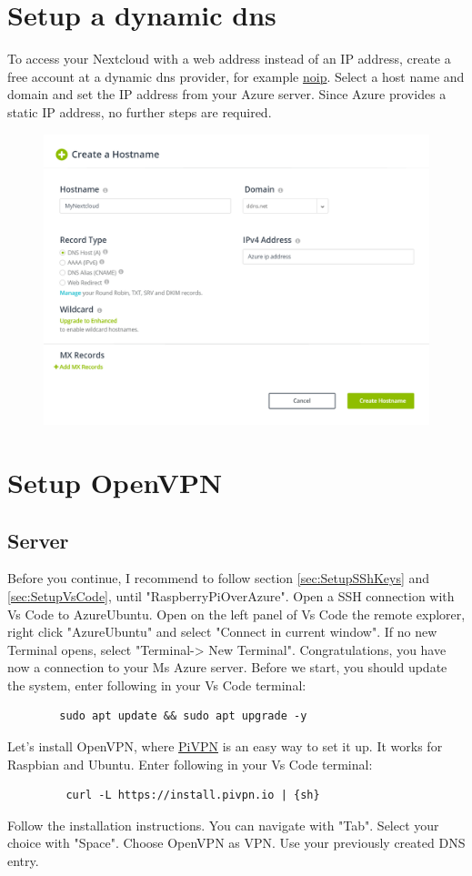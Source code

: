 \documentclass[a4paper,12pt]{article}
\begin{document}
	\section{Setup a dynamic dns}
	To access your Nextcloud with a web address instead of an IP address, create a free account at a dynamic dns provider, for example \href{https://my.noip.com/#!/dynamic-dns}{noip}. Select a host name and domain and set the IP address from your Azure server. Since Azure provides a static IP address, no further steps are required.
	\begin{figure}
		\includegraphics{images/NoIpSetHostname}
	\end{figure}
	\section{Setup OpenVPN}
	\subsection{Server}
	Before you continue, I recommend to follow section \ref{sec:SetupSShKeys} and \ref{sec:SetupVsCode}, until "RaspberryPiOverAzure". \newline
	Open a SSH connection with Vs Code to AzureUbuntu. Open on the left panel of Vs Code the remote explorer, right click "AzureUbuntu" and select "Connect in current window".
	If no new Terminal opens, select "Terminal-> New Terminal". \newline
	Congratulations, you have now a connection to your Ms Azure server.\newline
	Before we start, you should update the system, enter following in your Vs Code terminal:
	\begin{verbatim}
		sudo apt update && sudo apt upgrade -y
	\end{verbatim}
	Let's install OpenVPN, where \href{https://www.pivpn.io/}{PiVPN} is an easy way to set it up. It works for Raspbian and Ubuntu.
	Enter following in your Vs Code terminal:
	\begin{verbatim}
		 curl -L https://install.pivpn.io | {sh} 
	\end{verbatim}
	Follow the installation instructions. You can navigate with "Tab". Select your choice with "Space". Choose OpenVPN as VPN.  Use your previously created DNS entry. 
\end{document}
